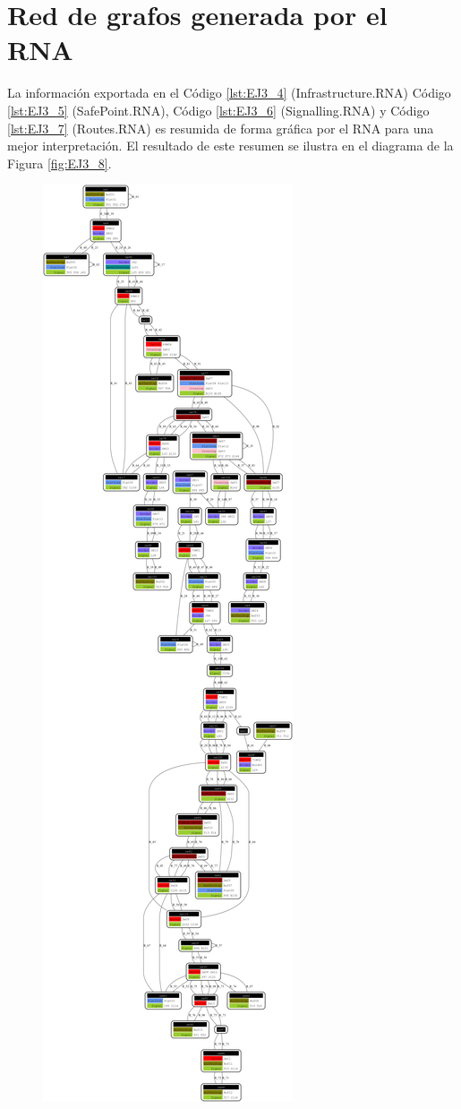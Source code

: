 \section{Red de grafos generada por el RNA}

	La información exportada en el Código \ref{lst:EJ3_4} (Infrastructure.RNA) Código \ref{lst:EJ3_5} (SafePoint.RNA), Código \ref{lst:EJ3_6} (Signalling.RNA) y Código \ref{lst:EJ3_7} (Routes.RNA) es resumida de forma gráfica por el RNA para una mejor interpretación. El resultado de este resumen se ilustra en el diagrama de la Figura \ref{fig:EJ3_8}.
	
	\begin{figure}[H]
		\centering
		\includegraphics[origin = c, width=\textwidth]{Figuras/Graph_3}

\end{figure}
